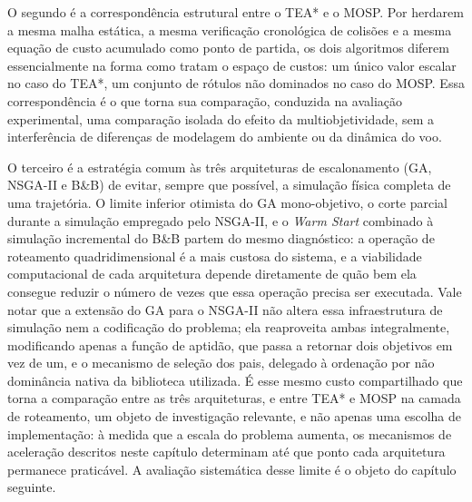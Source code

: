 O segundo é a correspondência estrutural entre o TEA* e o MOSP. Por herdarem a mesma malha estática, a mesma verificação cronológica de colisões e a mesma equação de custo acumulado como ponto de partida, os dois algoritmos diferem essencialmente na forma como tratam o espaço de custos: um único valor escalar no caso do TEA*, um conjunto de rótulos não dominados no caso do MOSP. Essa correspondência é o que torna sua comparação, conduzida na avaliação experimental, uma comparação isolada do efeito da multiobjetividade, sem a interferência de diferenças de modelagem do ambiente ou da dinâmica do voo.

O terceiro é a estratégia comum às três arquiteturas de escalonamento (GA, NSGA-II e B\&B) de evitar, sempre que possível, a simulação física completa de uma trajetória. O limite inferior otimista do GA mono-objetivo, o corte parcial durante a simulação empregado pelo NSGA-II, e o \textit{Warm Start} combinado à simulação incremental do B\&B partem do mesmo diagnóstico: a operação de roteamento quadridimensional é a mais custosa do sistema, e a viabilidade computacional de cada arquitetura depende diretamente de quão bem ela consegue reduzir o número de vezes que essa operação precisa ser executada. Vale notar que a extensão do GA para o NSGA-II não altera essa infraestrutura de simulação nem a codificação do problema; ela reaproveita ambas integralmente, modificando apenas a função de aptidão, que passa a retornar dois objetivos em vez de um, e o mecanismo de seleção dos pais, delegado à ordenação por não dominância nativa da biblioteca utilizada. É esse mesmo custo compartilhado que torna a comparação entre as três arquiteturas, e entre TEA* e MOSP na camada de roteamento, um objeto de investigação relevante, e não apenas uma escolha de implementação: à medida que a escala do problema aumenta, os mecanismos de aceleração descritos neste capítulo determinam até que ponto cada arquitetura permanece praticável. A avaliação sistemática desse limite é o objeto do capítulo seguinte.